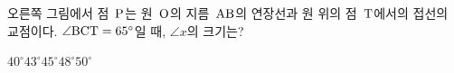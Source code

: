 \noindent\begin{minipage}[t]{0.58\linewidth}\vspace{0pt}\raggedright 오른쪽 그림에서 점~$\mathrm{P}$는 원~$\mathrm{O}$의 지름~$\mathrm{AB}$의 연장선과 원 위의 점~$\mathrm{T}$에서의 접선의 교점이다. $\angle\mathrm{BCT}=65^\circ$일 때, $\angle x$의 크기는?\end{minipage}\hfill\begin{minipage}[t]{0.4\linewidth}\vspace{0pt}\centering \resizebox{\ifdim\width>\linewidth\linewidth\else\width\fi}{!}{}\end{minipage}\par
\begin{choices32}{$40^\circ$}{$43^\circ$}{$45^\circ$}{$48^\circ$}{$50^\circ$}\end{choices32}
